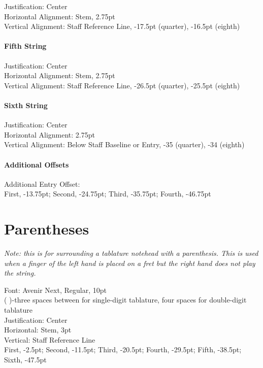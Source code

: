 \documentclass[unicode,hyperfootnotes=false,xetex,colorlinks=true,nofonts,nobib]{tufte-book} %
\begin{document}
Justification: Center\\
Horizontal Alignment: Stem, 2.75pt\\
Vertical Alignment: Staff Reference Line, -17.5pt (quarter), -16.5pt (eighth)

\paragraph{Fifth String}
\label{sec:fifth-string}

Justification: Center\\
Horizontal Alignment: Stem, 2.75pt\\
Vertical Alignment: Staff Reference Line, -26.5pt (quarter), -25.5pt (eighth)

\paragraph{Sixth String}
\label{sec:sixth-string}

Justification: Center\\
Horizontal Alignment: 2.75pt\\
Vertical Alignment: Below Staff Baseline or Entry, -35 (quarter), -34 (eighth)\\

\paragraph{Additional Offsets}
\label{sec:additional-offsets}

Additional Entry Offset:\\
\indent First, -13.75pt; Second, -24.75pt; Third, -35.75pt; Fourth, -46.75pt

\section{Parentheses}
\label{sec:parentheses}

\emph{Note: this is for surrounding a tablature notehead with a parenthesis. This is used when a finger of the left hand is placed on a fret but the right hand does not play the string.}

Font: Avenir Next, Regular, 10pt\\
(   )-three spaces between for single-digit tablature, four spaces for double-digit tablature\\
Justification: Center\\
Horizontal: Stem, 3pt\\
Vertical: Staff Reference Line\\
\indent First, -2.5pt; Second, -11.5pt; Third, -20.5pt; Fourth, -29.5pt; Fifth, -38.5pt; Sixth, -47.5pt
\end{document}
